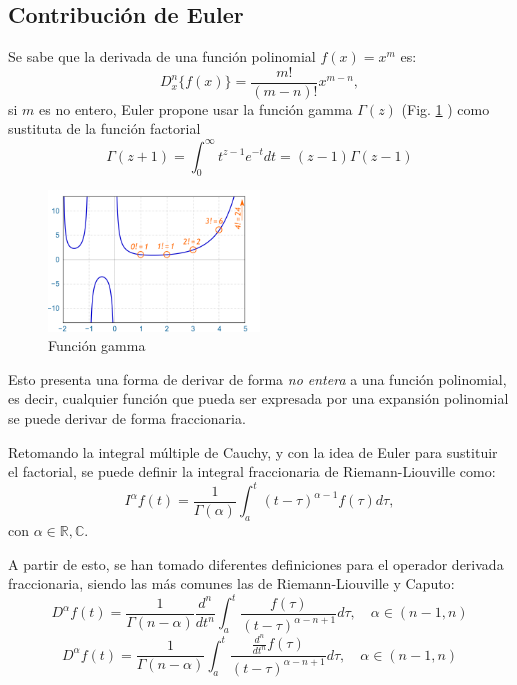 \documentclass[conference]{IEEEtran}
\begin{document}
\subsection*{Contribución de Euler}
Se sabe que la derivada de una función polinomial $f(x) = x^m$ es:
\begin{equation}
    D_x^n\{ f(x) \} = \frac{m!}{(m-n)!} x^{m-n},
\end{equation}
si $m$ es no entero, Euler propone usar la función gamma $\Gamma(z)$ (Fig. \ref{fig:gamma} ) como sustituta de la función factorial
\begin{equation}
    \Gamma(z+1) = \int_{0}^{\infty} t^{z-1} e^{-t} dt = (z-1)\Gamma(z-1)
\end{equation}
\begin{figure}[h]
    \centering
    \includegraphics[width=0.5\textwidth]{gamma-plot.png}
    \caption{Función gamma}
    \label{fig:gamma}
\end{figure}
Esto presenta una forma de derivar de forma \textit{no entera} a una función polinomial, es decir, cualquier función que pueda ser expresada por una expansión polinomial se puede derivar de forma fraccionaria.

Retomando la integral múltiple de Cauchy, y con la idea de Euler para sustituir el factorial, se puede definir la integral fraccionaria de Riemann-Liouville como:
\begin{equation}
    I^{\alpha} f(t) = \frac{1}{\Gamma(\alpha)} \int_{a}^{t} (t - \tau)^{\alpha - 1} f(\tau) d\tau,
\end{equation}
con $\alpha \in \mathbb{R}, \mathbb{C}$.

A partir de esto, se han tomado diferentes definiciones para el operador derivada fraccionaria, siendo las más comunes las de Riemann-Liouville\cite{riemann} y Caputo\cite{caputo}:
\begin{equation}
    D^{\alpha} f(t) = \frac{1}{\Gamma(n-\alpha)} \frac{d^n}{dt^n} \int_{a}^{t} \frac{f(\tau)}{(t - \tau)^{\alpha-n+1}}  d\tau, \quad \alpha \in (n-1, n)
\end{equation}
\begin{equation}
    D^{\alpha} f(t) = \frac{1}{\Gamma(n-\alpha)} \int_{a}^{t}  \frac{\frac{d^n}{dt^n} f(\tau)}{(t - \tau)^{\alpha-n+1}} d\tau, \quad \alpha \in (n-1, n)
\end{equation}
\end{document}
